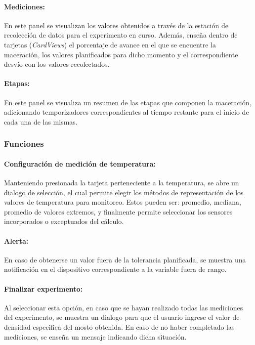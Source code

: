             \paragraph{Mediciones:}
            En este panel se visualizan los valores obtenidos a través de la estación de recolección de datos para el experimento en curso. Además, enseña dentro de tarjetas (\textit{CardViews}) el porcentaje de avance en el que se encuentre la maceración, los valores planificados para dicho momento y el correspondiente desvío con los valores recolectados.
            \paragraph{Etapas:}
            En este panel se visualiza un resumen de las etapas que componen la maceración, adicionando temporizadores correspondientes al tiempo restante para el inicio de cada una de las mismas.
            
            \subsubsection{Funciones}
            \paragraph{Configuración de medición de temperatura:} Manteniendo presionada la tarjeta perteneciente a la temperatura, se abre un dialogo de selección, el cual permite elegir los métodos de representación de los valores de temperatura para monitoreo. Estos pueden ser: promedio, mediana, promedio de valores extremos, y finalmente permite seleccionar los sensores incorporados o exceptuados del cálculo.
            \paragraph{Alerta:} 
            En caso de obtenerse un valor fuera de la tolerancia planificada, se muestra una notificación en el dispositivo correspondiente a la variable fuera de rango. 
            \paragraph{Finalizar experimento:}
            Al seleccionar esta opción, en caso que se hayan realizado todas las mediciones del experimento, se muestra un dialogo para que el usuario ingrese el valor de densidad especifica del mosto obtenida. En caso de no haber completado las mediciones, se enseña un mensaje indicando dicha situación.
